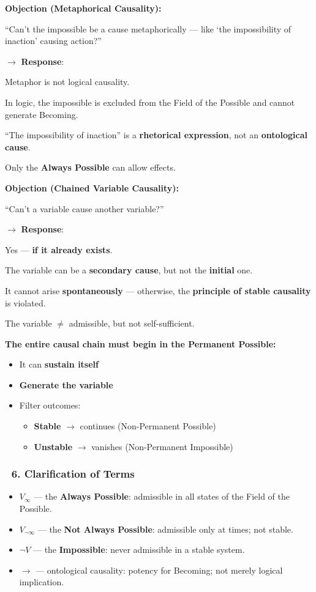 \documentclass[12pt]{article}
\begin{document}
\bigskip
\textbf{Objection (Metaphorical Causality):}

``Can’t the impossible be a cause metaphorically — like `the impossibility of inaction' causing action?''

$\rightarrow$ \textbf{Response}:

Metaphor is not logical causality.

In logic, the impossible is excluded from the Field of the Possible and cannot generate Becoming.

``The impossibility of inaction'' is a \textbf{rhetorical expression}, not an \textbf{ontological cause}.

Only the \textbf{Always Possible} can allow effects.

\bigskip
\textbf{Objection (Chained Variable Causality):}

``Can’t a variable cause another variable?''

$\rightarrow$ \textbf{Response}:

Yes — \textbf{if it already exists}.

The variable can be a \textbf{secondary cause}, but not the \textbf{initial} one.

It cannot arise \textbf{spontaneously} — otherwise, the \textbf{principle of stable causality} is violated.

The variable $\neq$ admissible, but not self-sufficient.

\bigskip
\textbf{The entire causal chain must begin in the Permanent Possible:}
\begin{itemize}
\item It can \textbf{sustain itself}
\item \textbf{Generate the variable}
\item Filter outcomes:
\begin{itemize}
\item \textbf{Stable} $\rightarrow$ continues (Non-Permanent Possible)
\item \textbf{Unstable} $\rightarrow$ vanishes (Non-Permanent Impossible)
\end{itemize}
\end{itemize}

\subsubsection*{🔹 6. Clarification of Terms}
\begin{itemize}
\item $V_\infty$ — the \textbf{Always Possible}: admissible in all states of the Field of the Possible.
\item $V_{\neg\infty}$ — the \textbf{Not Always Possible}: admissible only at times; not stable.
\item $\neg V$ — the \textbf{Impossible}: never admissible in a stable system.
\item $\rightarrow$ — ontological causality: potency for Becoming; not merely logical implication.
\end{itemize}
\end{document}

